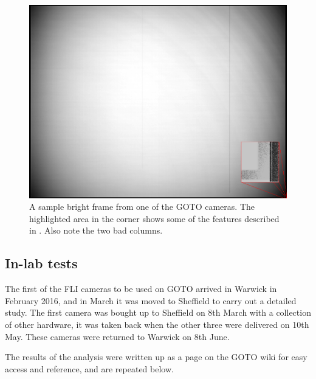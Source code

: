 \begin{colsection}
\begin{colsection}
\begin{figure}[p]
    \begin{center}
        \includegraphics[width=\textwidth]{images/sample.png}
    \end{center}
    \caption[TODO]{
        A sample bright frame from one of the GOTO cameras. The highlighted area in the corner shows some of the features described in . Also note the two bad columns.
        }\label{fig:frame}
\end{figure}

\clearpage

\end{colsection}

\subsection{In-lab tests}
\label{sec:detector_tests}
\begin{colsection}

The first of the FLI cameras to be used on GOTO arrived in Warwick in February 2016, and in March it was moved to Sheffield to carry out a detailed study.
The first camera was bought up to Sheffield on 8th March with a collection of other hardware, it was taken back when the other three were delivered on 10th May. These cameras were returned to Warwick on 8th June.

The results of the analysis were written up as a page on the GOTO wiki for easy access and reference, and are repeated below.


\end{colsection}
\end{colsection}
